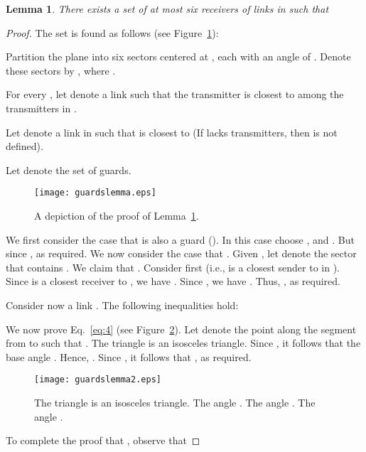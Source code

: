 \documentclass[11pt]{article}
\newenvironment{proof sketch}{\noindent {\bf Proof sketch:} }{\hfill \qed}
\newtheorem{lemma}{Lemma}
\begin{document}
\begin{lemma}\label{lem:guards}
  There exists a set  of at most six receivers of links in
   such that

\end{lemma}
\begin{proof}
  The set  is found as follows (see Figure~\ref{fig:guards1}):
  \begin{inparaenum}[(i)]
  \item Partition the plane into six sectors centered at , each
    with an angle of . Denote these sectors by
    , where .
  \item For every , let  denote a link
    such that the transmitter  is closest to  among the
    transmitters in .
  \item Let  denote a link in  such that  is
    closest to  (If  lacks
    transmitters, then  is not defined).
  \end{inparaenum}
  Let  denote the set of guards.


\begin{figure}[H]
  \centering
    \texttt{[image: guardslemma.eps]}
    \caption{
    A depiction of the proof of Lemma~\ref{lem:guards}.
}
  \label{fig:guards1}
\end{figure}


We first consider the case that  is also a guard ().
In this case choose , and . But  since , as required.
We now consider the case that .
  Given , let  denote the sector that
  contains .  We claim that .
  Consider first  (i.e.,  is a closest sender to
   in ).  Since  is a closest receiver to
  , we have .  Since , we have .  Thus, , as required.

  Consider now a link .  The following
  inequalities hold:
  

We now prove Eq.~\ref{eq:4} (see Figure~\ref{fig:guards2}).  Let  denote the point along the
segment from  to  such that .  The
triangle  is an isosceles triangle.  Since
, it follows that the base
angle .  Hence, .  Since ,
it follows that , as required.

\begin{figure}[H]
  \centering
    \texttt{[image: guardslemma2.eps]}
    \caption{ The
triangle  is an isosceles triangle. The angle . The angle . The angle .}
  \label{fig:guards2}
\end{figure}

To complete the proof that , observe that

\end{proof}
\end{document}
